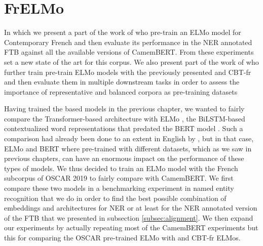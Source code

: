 \chapter{FrELMo}

\begin{center}
    \begin{minipage}{0.66\textwidth}
        \begin{small}
            In which we present a part of the work of \citet{ortiz-suarez-etal-2020-establishing} who pre-train an ELMo model for Contemporary French and then evaluate its performance in the NER annotated FTB against all the available versions of CamemBERT. From these experiments \citet{ortiz-suarez-etal-2020-establishing} set a new state of the art for this corpus. We also present part of the work of \citet{popa-fabre-etal-2020-french} who further train pre-train ELMo models with the previously presented \Cabernet and CBT-fr and then evaluate them in multiple downstream tasks in order to assess the importance of representative and balanced corpora as pre-training datasets
        \end{small}
    \end{minipage}
    \vspace{0.5cm}
\end{center}

Having trained the \roberta \citep{liu-etal-2019-roberta} based \camembert \citep{martin-etal-2020-camembert} models in the previous chapter, we wanted to fairly compare the Transformer-based architecture with ELMo \citep{peters-etal-2018-deep}, the BiLSTM-based contextualized word representations that predated the BERT model \citep{devlin-etal-2019-bert}. Such a comparison had already been done to an extent in English by \citet{peters-etal-2019-tune}, but in that case, ELMo and BERT where pre-trained with different datasets, which as we saw in previous chapters, can have an enormous impact on the performance of these types of models. We thus decided to train an ELMo model with the French subcorpus of OSCAR 2019 to fairly compare with CamemBERT. We first compare these two models in a benchmarking experiment in named entity recognition that we do in order to find the best possible combination of embeddings and architectures for NER or at least for the NER annotated version of the FTB that we presented in subsection \ref{subsec:alignment}. We then expand our experiments by actually repeating most of the CamemBERT experiments but this for comparing the OSCAR pre-trained ELMo with \Cabernet and CBT-fr ELMos.

